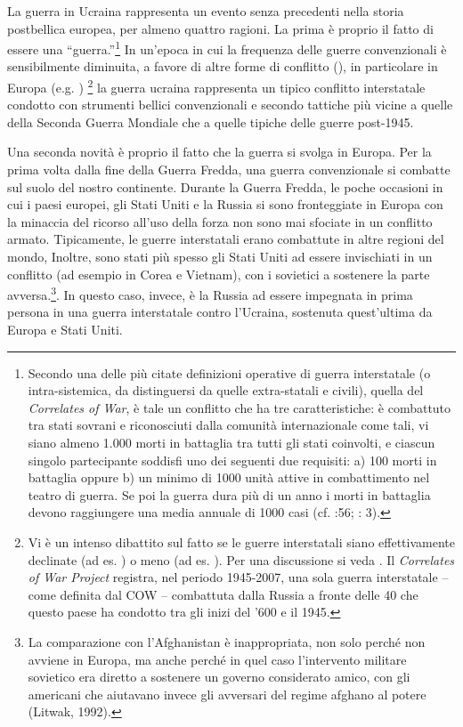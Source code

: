 \documentclass[
  openany]{book}
\begin{document}
La guerra in Ucraina rappresenta un evento senza precedenti nella storia postbellica europea, per almeno quattro ragioni. La prima è proprio il fatto di essere una ``guerra.''\footnote{Secondo una delle più citate definizioni operative di guerra interstatale (o intra-sistemica, da distinguersi da quelle extra-statali e civili), quella del \emph{Correlates of War}, è tale un conflitto che ha tre caratteristiche: è combattuto tra stati sovrani e riconosciuti dalla comunità internazionale come tali, vi siano almeno 1.000 morti in battaglia tra tutti gli stati coinvolti, e ciascun singolo partecipante soddisfi uno dei seguenti due requisiti: a) 100 morti in battaglia oppure b) un minimo di 1000 unità attive in combattimento nel teatro di guerra. Se poi la guerra dura più di un anno i morti in battaglia devono raggiungere una media annuale di 1000 casi (cf. \citet{Small-Singer1982} :56; \citet{Sarkees} : 3).} In un'epoca in cui la frequenza delle guerre convenzionali è sensibilmente diminuita, a favore di altre forme di conflitto (\citet{Sarkees-Wayman-Singer2003}), in particolare in Europa (e.g. \citet{Gaddis1986}) \footnote{Vi è un intenso dibattito sul fatto se le guerre interstatali siano effettivamente declinate (ad es. \citet{Pinker2011}) o meno (ad es. \citet{Braumoeller2019}). Per una discussione si veda \citet{Gleditsch-Pinker-Thayer-Levy-Thompson2013}. Il \emph{Correlates of War Project} registra, nel periodo 1945-2007, una sola guerra interstatale -- come definita dal COW -- combattuta dalla Russia a fronte delle 40 che questo paese ha condotto tra gli inizi del '600 e il 1945.} la guerra ucraina rappresenta un tipico conflitto interstatale condotto con strumenti bellici convenzionali e secondo tattiche più vicine a quelle della Seconda Guerra Mondiale che a quelle tipiche delle guerre post-1945.

Una seconda novità è proprio il fatto che la guerra si svolga in Europa. Per la prima volta dalla fine della Guerra Fredda, una guerra convenzionale si combatte sul suolo del nostro continente. Durante la Guerra Fredda, le poche occasioni in cui i paesi europei, gli Stati Uniti e la Russia si sono fronteggiate in Europa con la minaccia del ricorso all'uso della forza non sono mai sfociate in un conflitto armato. Tipicamente, le guerre interstatali erano combattute in altre regioni del mondo, Inoltre, sono stati più spesso gli Stati Uniti ad essere invischiati in un conflitto (ad esempio in Corea e Vietnam), con i sovietici a sostenere la parte avversa.\footnote{La comparazione con l'Afghanistan è inappropriata, non solo perché non avviene in Europa, ma anche perché in quel caso l'intervento militare sovietico era diretto a sostenere un governo considerato amico, con gli americani che aiutavano invece gli avversari del regime afghano al potere (Litwak, 1992).}. In questo caso, invece, è la Russia ad essere impegnata in prima persona in una guerra interstatale contro l'Ucraina, sostenuta quest'ultima da Europa e Stati Uniti.
\end{document}
